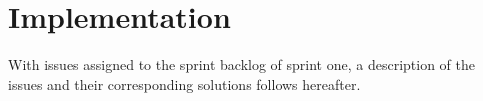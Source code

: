 \section{Implementation}
With issues assigned to the sprint backlog of sprint one, a description of the issues and their corresponding solutions follows hereafter.












